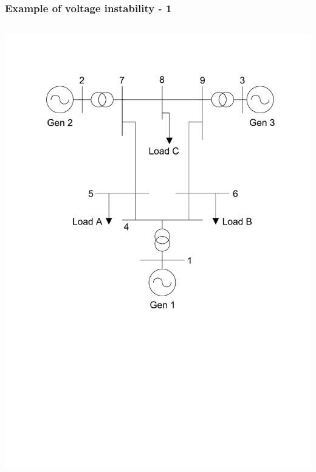 \documentclass{beamer}
\begin{document}
\begin{frame}[label=example]
\frametitle{Example of voltage instability - 1}
\begin{columns}
\includegraphics[width=\textwidth]{Figs/Ieee9bus.pdf}

\end{columns}
\end{frame}
\end{document}
